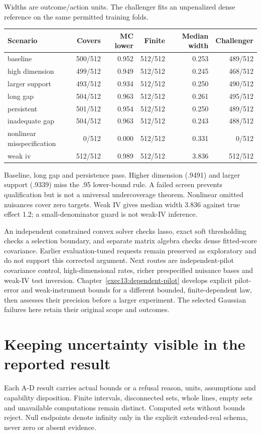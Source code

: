 Widths are outcome/action units. The challenger fits an unpenalized dense reference on the same permitted training folds.

\begin{center}\footnotesize\begin{tabular}{lrrrrr}\toprule
Scenario & Covers & MC lower & Finite & Median width & Challenger\\
\midrule
baseline & 500/512 & 0.952 & 512/512 & 0.253 & 489/512 \\
high dimension & 499/512 & 0.949 & 512/512 & 0.245 & 468/512 \\
larger support & 493/512 & 0.934 & 512/512 & 0.250 & 490/512 \\
long gap & 504/512 & 0.963 & 512/512 & 0.261 & 495/512 \\
persistent & 501/512 & 0.954 & 512/512 & 0.250 & 489/512 \\
inadequate gap & 504/512 & 0.963 & 512/512 & 0.243 & 488/512 \\
nonlinear misspecification & 0/512 & 0.000 & 512/512 & 0.331 & 0/512 \\
weak iv & 512/512 & 0.989 & 512/512 & 3.836 & 512/512 \\
\bottomrule\end{tabular}\end{center}


Baseline, long gap and persistence pass. Higher dimension (.9491) and larger support (.9339) miss the .95 lower-bound rule. A failed screen prevents qualification but is not a universal undercoverage theorem. Nonlinear omitted nuisances cover zero targets. Weak IV gives median width 3.836 against true effect 1.2; a small-denominator guard is not weak-IV inference.

An independent constrained convex solver checks lasso, exact soft thresholding checks a selection boundary, and separate matrix algebra checks dense fitted-score covariance. Earlier evaluation-tuned requests remain preserved as exploratory and do not support this corrected argument. Next routes are independent-pilot covariance control, high-dimensional rates, richer prespecified nuisance bases and weak-IV test inversion. Chapter~\ref{exec13:dependent-pilot} develops explicit pilot-error and weak-instrument bounds for a different bounded, finite-dependent law, then assesses their precision before a larger experiment. The selected Gaussian failures here retain their original scope and outcomes.

\section{Keeping uncertainty visible in the reported result}
Each A-D result carries actual bounds or a refusal reason, units, assumptions and capability disposition. Finite intervals, disconnected sets, whole lines, empty sets and unavailable computations remain distinct. Computed sets without bounds reject. Null endpoints denote infinity only in the explicit extended-real schema, never zero or absent evidence.


